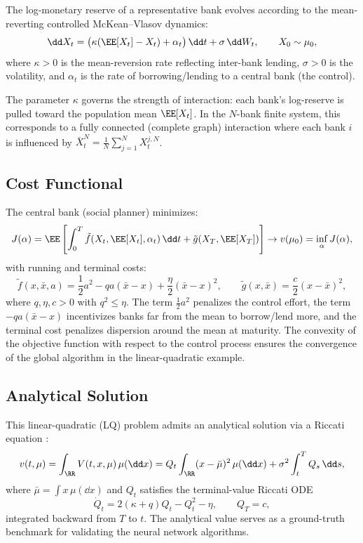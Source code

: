 \documentclass[11pt]{article}
\begin{document}
The log-monetary reserve of a representative bank evolves according to the mean-reverting controlled McKean--Vlasov dynamics:
\begin{equation}\label{eq:systemic-sde}
  \dd X_t = \big(\kappa(\EE[X_t] - X_t) + \alpha_t\big)\,\dd t + \sigma\,\dd W_t, \qquad X_0 \sim \mu_0,
\end{equation}
where $\kappa > 0$ is the mean-reversion rate reflecting inter-bank lending, $\sigma > 0$ is the volatility, and $\alpha_t$ is the rate of borrowing/lending to a central bank (the control).

The parameter $\kappa$ governs the strength of interaction: each bank's log-reserve is pulled toward the population mean $\EE[X_t]$. In the $N$-bank finite system, this corresponds to a fully connected (complete graph) interaction where each bank $i$ is influenced by $\bar{X}_t^N = \frac{1}{N}\sum_{j=1}^N X_t^{j,N}$.

\subsection{Cost Functional}

The central bank (social planner) minimizes:
\begin{equation}\label{eq:systemic-cost}
  J(\alpha) = \EE\left[\int_0^T \tilde{f}(X_t, \EE[X_t], \alpha_t)\,\dd t + \tilde{g}(X_T, \EE[X_T])\right] \to v(\mu_0) = \inf_\alpha J(\alpha),
\end{equation}
with running and terminal costs:
\begin{equation}\label{eq:systemic-costs-detail}
  \tilde{f}(x, \bar{x}, a) = \frac{1}{2}a^2 - qa(\bar{x} - x) + \frac{\eta}{2}(\bar{x} - x)^2, \qquad \tilde{g}(x, \bar{x}) = \frac{c}{2}(x - \bar{x})^2,
\end{equation}
where $q, \eta, c > 0$ with $q^2 \le \eta$. The term $\frac{1}{2}a^2$ penalizes the control effort, the term $-qa(\bar{x} - x)$ incentivizes banks far from the mean to borrow/lend more, and the terminal cost penalizes dispersion around the mean at maturity. The convexity of the objective function with respect to the control process ensures the convergence of the global algorithm in the linear-quadratic example.

\subsection{Analytical Solution}

This linear-quadratic (LQ) problem admits an analytical solution via a Riccati equation \citep{carmona2018mfg1}:
\begin{equation}\label{eq:systemic-value}
  v(t, \mu) = \int_{\RR} V(t, x, \mu)\,\mu(\dd x) = Q_t \int_{\RR} (x - \bar{\mu})^2\,\mu(\dd x) + \sigma^2 \int_t^T Q_s\,\dd s,
\end{equation}
where $\bar{\mu} = \int x\,\mu(\dd x)$ and $Q_t$ satisfies the terminal-value Riccati ODE
\begin{equation}\label{eq:riccati-ode}
  \dot{Q}_t = 2(\kappa + q)Q_t - Q_t^2 - \eta, \qquad Q_T = c,
\end{equation}
integrated backward from $T$ to $t$. The analytical value serves as a ground-truth benchmark for validating the neural network algorithms.
\end{document}
